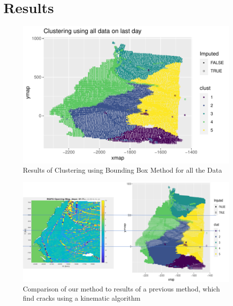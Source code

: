 \documentclass[12pt]{article}
\begin{document}
\hypertarget{results}{%
\section{Results}\label{results}}

\begin{figure}[tbp]

{\centering \includegraphics[width=\linewidth,]{spatio-temporal-model-arctic-sea-ice_files/figure-latex/ex-result-1} 

}

\caption{Results of Clustering using Bounding Box Method for all the Data}\label{fig:ex-result}
\end{figure}

\begin{figure}[tbp]

{\centering \includegraphics[width=1\linewidth,]{images/all_weeks_comp_correct} 

}

\caption{Comparison of our method to results of a previous method, which find cracks using a kinematic algorithm}\label{fig:all-week-comp}
\end{figure}
\end{document}
